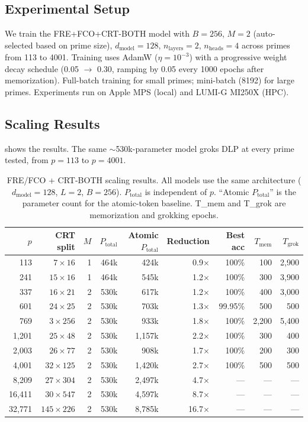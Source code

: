 \documentclass[11pt]{article}
\newcommand{\Tmem}{T_{\mathrm{mem}}}
\newcommand{\Tgrok}{T_{\mathrm{grok}}}
\newcommand{\Ptotal}{P_{\mathrm{total}}}
\newcommand{\dmodel}{d_{\mathrm{model}}}
\newcommand{\nheads}{n_{\mathrm{heads}}}
\newcommand{\nlayers}{n_{\mathrm{layers}}}
\begin{document}
\subsection{Experimental Setup}

We train the FRE+FCO+CRT-BOTH model with $B = 256$, $M = 2$ (auto-selected based on prime size), $\dmodel = 128$, $\nlayers = 2$, $\nheads = 4$ across primes from 113 to 4001. Training uses AdamW ($\eta = 10^{-3}$) with a progressive weight decay schedule (0.05 $\to$ 0.30, ramping by 0.05 every 1000 epochs after memorization). Full-batch training for small primes; mini-batch (8192) for large primes. Experiments run on Apple MPS (local) and LUMI-G MI250X (HPC).

\subsection{Scaling Results}

 shows the results. The same $\sim$530k-parameter model groks DLP at every prime tested, from $p = 113$ to $p = 4001$.

\begin{table}[t]
\centering
\caption{FRE/FCO + CRT-BOTH scaling results. All models use the same architecture ($\dmodel = 128$, $L = 2$, $B = 256$). $\Ptotal$ is independent of $p$. ``Atomic $\Ptotal$'' is the parameter count for the atomic-token baseline. T\_mem and T\_grok are memorization and grokking epochs.}
\label{tab:results}
\begin{tabular}{rrrrrrrrr}
\toprule
$p$ & CRT split & $M$ & $\Ptotal$ & Atomic $\Ptotal$ & Reduction & Best acc & $\Tmem$ & $\Tgrok$ \\
\midrule
113 & $7 \times 16$ & 1 & 464k & 424k & 0.9$\times$ & 100\% & 100 & 2,900 \\
241 & $15 \times 16$ & 1 & 464k & 545k & 1.2$\times$ & 100\% & 300 & 3,900 \\
337 & $16 \times 21$ & 2 & 530k & 617k & 1.2$\times$ & 100\% & 400 & 3,000 \\
601 & $24 \times 25$ & 2 & 530k & 703k & 1.3$\times$ & 99.95\% & 500 & 500 \\
769 & $3 \times 256$ & 2 & 530k & 933k & 1.8$\times$ & 100\% & 2,200 & 5,400 \\
1,201 & $25 \times 48$ & 2 & 530k & 1,157k & 2.2$\times$ & 100\% & 300 & 400 \\
2,003 & $26 \times 77$ & 2 & 530k & 908k & 1.7$\times$ & 100\% & 200 & 300 \\
4,001 & $32 \times 125$ & 2 & 530k & 1,420k & 2.7$\times$ & 100\% & 500 & 500 \\
\midrule
8,209 & $27 \times 304$ & 2 & 530k & 2,497k & 4.7$\times$ & --- & --- & --- \\
16,411 & $30 \times 547$ & 2 & 530k & 4,597k & 8.7$\times$ & --- & --- & --- \\
32,771 & $145 \times 226$ & 2 & 530k & 8,785k & 16.7$\times$ & --- & --- & --- \\
\bottomrule
\end{tabular}
\end{table}
\end{document}
